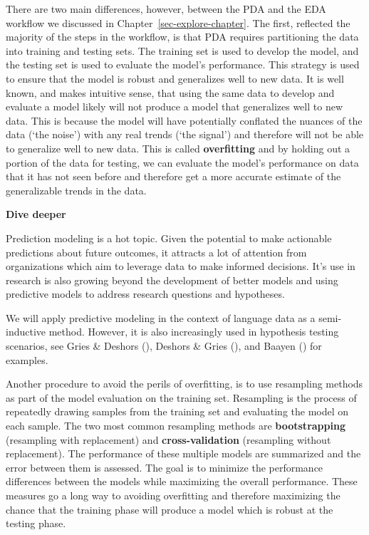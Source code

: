 \documentclass[
  letterpaper,
  krantz1]{latex/krantz-mod}
\theoremstyle{definition}
\theoremstyle{definition}
\theoremstyle{remark}
\begin{document}
There are two main differences, however, between the PDA and the EDA
workflow we discussed in Chapter~\ref{sec-explore-chapter}. The first,
reflected the majority of the steps in the workflow, is that PDA
requires partitioning the data into training and testing sets. The
training set is used to develop the model, and the testing set is used
to evaluate the model's performance. This strategy is used to ensure
that the model is robust and generalizes well to new data. It is well
known, and makes intuitive sense, that using the same data to develop
and evaluate a model likely will not produce a model that generalizes
well to new data. This is because the model will have potentially
conflated the nuances of the data (`the noise') with any real trends
(`the signal') and therefore will not be able to generalize well to new
data. This is called \textbf{overfitting} and by holding out a portion
of the data for testing, we can evaluate the model's performance on data
that it has not seen before and therefore get a more accurate estimate
of the generalizable trends in the data.

\begin{tcolorbox}[enhanced jigsaw, leftrule=.75mm, colframe=quarto-callout-color-frame, left=2mm, colback=white, toprule=.15mm, breakable, arc=.35mm, opacityback=0, bottomrule=.15mm, rightrule=.15mm]

\textbf{ Dive deeper}

Prediction modeling is a hot topic. Given the potential to make
actionable predictions about future outcomes, it attracts a lot of
attention from organizations which aim to leverage data to make informed
decisions. It's use in research is also growing beyond the development
of better models and using predictive models to address research
questions and hypotheses.

We will apply predictive modeling in the context of language data as a
semi-inductive method. However, it is also increasingly used in
hypothesis testing scenarios, see Gries \& Deshors
(), Deshors \& Gries
(), and Baayen
() for examples.

\end{tcolorbox}

Another procedure to avoid the perils of overfitting, is to use
resampling methods as part of the model evaluation on the training set.
Resampling is the process of repeatedly drawing samples from the
training set and evaluating the model on each sample. The two most
common resampling methods are \textbf{bootstrapping} (resampling with
replacement) and \textbf{cross-validation} (resampling without
replacement). The performance of these multiple models are summarized
and the error between them is assessed. The goal is to minimize the
performance differences between the models while maximizing the overall
performance. These measures go a long way to avoiding overfitting and
therefore maximizing the chance that the training phase will produce a
model which is robust at the testing phase.
\end{document}
